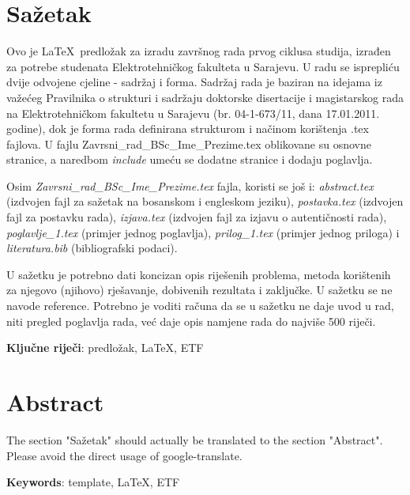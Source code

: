 \pagebreak

\section*{Sažetak}


Ovo je \LaTeX\ predložak za izradu završnog rada prvog ciklusa studija, izrađen za potrebe studenata Elektrotehničkog fakulteta u Sarajevu. U radu se isprepliću dvije odvojene cjeline - sadržaj i forma. Sadržaj rada je baziran na idejama iz važećeg Pravilnika o strukturi i sadržaju doktorske disertacije i magistarskog rada na Elektrotehničkom fakultetu u Sarajevu (br. 04-1-673/11, dana 17.01.2011. godine), dok je forma rada definirana strukturom i načinom korištenja .tex fajlova.
U fajlu Zavrsni\_rad\_BSc\_Ime\_Prezime.tex oblikovane su osnovne stranice, a naredbom \textit{include} umeću se dodatne stranice i dodaju poglavlja. 

Osim \textit{Zavrsni\_rad\_BSc\_Ime\_Prezime.tex} fajla, koristi se još i: \textit{abstract.tex} (izdvojen fajl za sažetak na bosanskom i engleskom jeziku), \textit{postavka.tex} (izdvojen fajl za postavku rada), \textit{izjava.tex} (izdvojen fajl za izjavu o autentičnosti rada), \textit{poglavlje\_1.tex} (primjer jednog poglavlja),\textit{ prilog\_1.tex} (primjer jednog priloga) i \textit{literatura.bib} (bibliografski podaci).

U sažetku je potrebno dati koncizan opis riješenih problema, metoda korištenih za njegovo (njihovo) rješavanje, dobivenih rezultata i zaključke. U sažetku se ne navode reference. Potrebno je voditi računa da se u sažetku ne daje uvod u rad, niti pregled poglavlja rada, već daje opis namjene rada do najviše 500 riječi.

\vspace{1cm}
\textbf{Ključne riječi}:  predložak, \LaTeX, ETF

\section*{Abstract}

The section "Sažetak" should actually be translated to the section "Abstract". Please avoid the direct usage of google-translate.  

\vspace{1cm}
\textbf{Keywords}:  template, \LaTeX , ETF